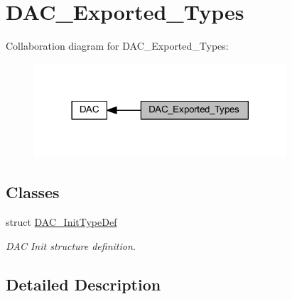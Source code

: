 \hypertarget{group___d_a_c___exported___types}{}\section{D\+A\+C\+\_\+\+Exported\+\_\+\+Types}
\label{group___d_a_c___exported___types}
Collaboration diagram for D\+A\+C\+\_\+\+Exported\+\_\+\+Types\+:
\nopagebreak
\begin{figure}[H]
\begin{center}
\leavevmode
\includegraphics[width=266pt]{group___d_a_c___exported___types}
\end{center}
\end{figure}
\subsection*{Classes}
\begin{DoxyCompactItemize}
\item 
struct \hyperlink{struct_d_a_c___init_type_def}{D\+A\+C\+\_\+\+Init\+Type\+Def}
\begin{DoxyCompactList}\small\item\em D\+AC Init structure definition. \end{DoxyCompactList}\end{DoxyCompactItemize}


\subsection{Detailed Description}
